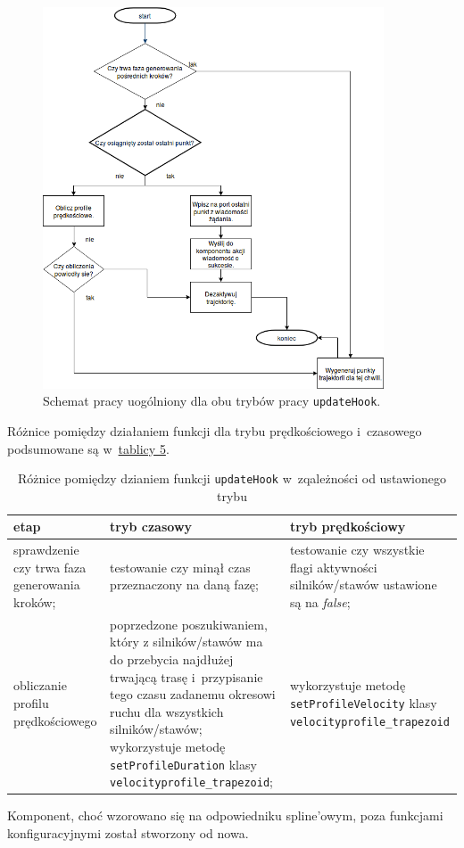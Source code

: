\documentclass[a4paper, 12pt]{article}
\begin{document}
	\begin{figure}[H]
	\centering
	\includegraphics[width=0.9\textwidth]{raport_pics/updateHookDiagram.png}
	\caption{Schemat pracy uogólniony dla obu trybów pracy \texttt{updateHook}.}
	\label{uHD}
	\end{figure}
	\par Różnice pomiędzy działaniem funkcji dla trybu prędkościowego i~czasowego podsumowane są w~\hyperref[tab:modediffUH]{tablicy 5}.
	
	\begin{table}[H]
	\label{tab:modediffUH}
	\centering
	\begin{tabular}{|m{9em}|m{14em}|m{14em}|}
	\hline
	etap & tryb czasowy & tryb prędkościowy\\
	\hline
	\hline
	sprawdzenie czy trwa faza generowania kroków; & testowanie czy minął czas przeznaczony na daną fazę; & testowanie czy wszystkie flagi aktywności silników/stawów ustawione są na \textit{false}; \\  
	\hline
	obliczanie profilu prędkościowego & poprzedzone poszukiwaniem, który z silników/stawów ma do przebycia najdłużej trwającą trasę i~przypisanie tego czasu zadanemu okresowi ruchu dla wszystkich silników/stawów; wykorzystuje metodę \texttt{setProfileDuration} klasy \texttt{velocityprofile\_trapezoid}; & wykorzystuje metodę \texttt{setProfileVelocity} klasy \texttt{velocityprofile\_trapezoid}\\
	\hline
	\end{tabular}
	\caption{Różnice pomiędzy dzianiem funkcji \texttt{updateHook} w~zqależności od ustawionego trybu}
	\end{table}
	\par Komponent, choć wzorowano się na odpowiedniku spline'owym, poza  funkcjami konfiguracyjnymi został stworzony od nowa.
\end{document}
